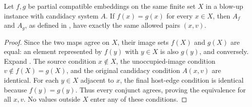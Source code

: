 \begin{lemma}
Let $f,g$ be partial compatible embeddings on the same finite set $X$
in a blow-up instance with candidacy system $A$. If $f(x)=g(x)$ for
every $x\in X$, then $A_f$ and $A_g$, as defined in
, have exactly the same allowed pairs $(x,v)$.
\end{lemma}
\begin{proof}
Since the two maps agree on $X$, their image sets $f(X)$ and $g(X)$
are equal: an element represented by $f(y)$ with $y\in X$ is also
$g(y)$, and conversely. Expand .
The source condition $x\notin X$, the unoccupied-image condition
$v\notin f(X)=g(X)$, and the original candidacy condition $A(x,v)$
are identical. For each $y\in X$ adjacent to $x$, the final host-edge
condition is identical because $f(y)=g(y)$. Thus every conjunct agrees,
proving the equivalence for all $x,v$. No values outside $X$ enter
any of these conditions.
\end{proof}
